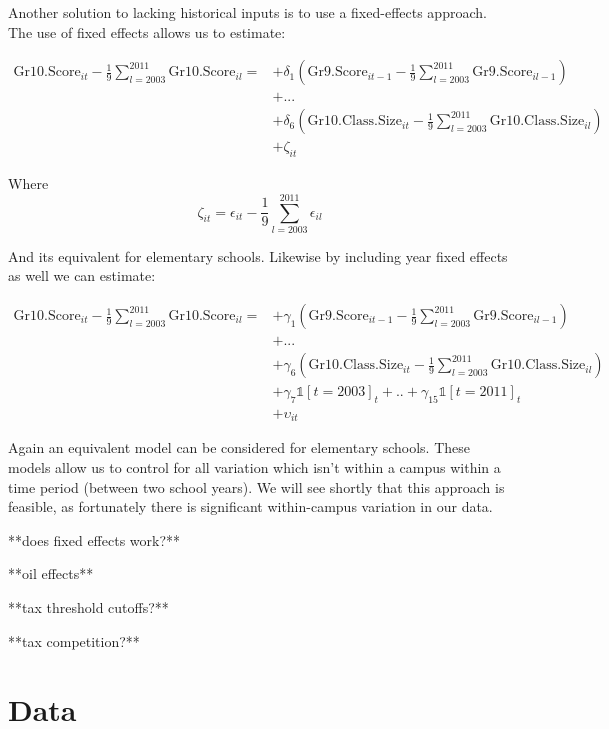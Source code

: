 \documentclass[11pt]{article}
\begin{document}
Another solution to lacking historical inputs is to use a fixed-effects approach. The use of fixed effects allows us to estimate:

\begin{align*}
\mathrm{Gr10.Score}_{it} - \frac{1}{9}\sum_{l=2003}^{2011} \mathrm{Gr10.Score}_{il}  = 
    &+\delta_{1}(\mathrm{Gr9.Score}_{it-1} - \frac{1}{9}\sum_{l=2003}^{2011} \mathrm{Gr9.Score}_{il-1})\\
    &+...\\
    &+\delta_{6}(\mathrm{Gr10.Class.Size}_{it} - \frac{1}{9}\sum_{l=2003}^{2011} \mathrm{Gr10.Class.Size}_{il})\\     &+\zeta_{it}
\end{align*}

Where $$   \zeta_{it} = \epsilon_{it} - \frac{1}{9}\sum_{l=2003}^{2011} \epsilon_{il}$$

And its equivalent for elementary schools. Likewise by including year fixed effects as well we can estimate:

\begin{align*}
\mathrm{Gr10.Score}_{it} - \frac{1}{9}\sum_{l=2003}^{2011} \mathrm{Gr10.Score}_{il}  = 
    &+\gamma_{1}(\mathrm{Gr9.Score}_{it-1} - \frac{1}{9}\sum_{l=2003}^{2011} \mathrm{Gr9.Score}_{il-1})\\
    &+...\\
    &+\gamma_{6}(\mathrm{Gr10.Class.Size}_{it} - \frac{1}{9}\sum_{l=2003}^{2011} \mathrm{Gr10.Class.Size}_{il})\\     
    &+\gamma_{7}\mathbb{1}[t=2003]_{t}+..+\gamma_{15}\mathbb{1}[t=2011]_{t}\\
    &+\upsilon_{it}
\end{align*}

Again an equivalent model can be considered for elementary schools. These models allow us to control for all variation which isn't within a campus within a time period (between two school years). We will see shortly that this approach is feasible, as fortunately there is significant within-campus variation in our data. 


**does fixed effects work?**


**oil effects**

**tax threshold cutoffs?**

**tax competition?**


\section{Data}
\end{document}
